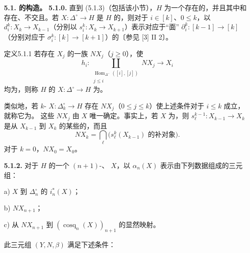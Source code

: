 \textbf{5.1. 的构造。}
\textbf{5.1.0.} 直到 (5.1.3)（包括该小节），$H$ 为一个存在的，并且其中和存在、不交且。若 $X:\Delta^\circ\to H$ 是 $H$ 的，则对于 $i\in[k]$、$0\leq k$，以 $d_i^k:X_k\to X_{k-1}$（分别以 $s_i^k:X_k\to X_{k+1}$）表示对应于“面” $\partial_i^k:[k-1]\to[k]$（分别对应于 $\sigma_i^k:[k]\to[k+1]$）的〔参见 [3] II 2〕。
\begin{SGAresult}{定义}{5.1.1}
若存在 $X_j$ 的一族 $NX_j$（$j\geq0$），使
\[
h_i:\coprod_{\substack{\operatorname{Hom}_{\Delta^-}([i],[j])\\j\leq i}}NX_j\longrightarrow X_i
\]
均为，则称 $H$ 的 $X:\Delta^\circ\to H$ 为。
\end{SGAresult}
类似地，若 $k$- $X:\Delta_k^\circ\to H$ 存在 $NX_j$（$0\leq j\leq k$）使上述条件对于 $i\leq k$ 成立，就称它为。
这些 $NX_j$ 由 $X$ 唯一确定。事实上，若 $X$ 为，则 $s_\ell^{k-1}:X_{k-1}\to X_k$ 是从 $X_{k-1}$ 到 $X_k$ 的某些的，而且
\[
NX_k=\bigcap_\ell\bigl(s_\ell^k(X_{k-1})\text{ 的补对象}\bigr).
\]
对于 $k=0$，$NX_0=X_0$。

\textbf{5.1.2.} 对于 $H$ 的一个 $(n+1)$-、 $X$，以 $\alpha_n(X)$ 表示由下列数据组成的三元组：

 a) $X$ 到 $\Delta_n^\circ$ 的 $i_n^*(X)$；

 b) $NX_{n+1}$；

 c) 从 $NX_{n+1}$ 到 $(\operatorname{cosq}_n(X))_{n+1}$ 的显然映射。

此三元组 $(Y,N,\beta)$ 满足下述条件：


